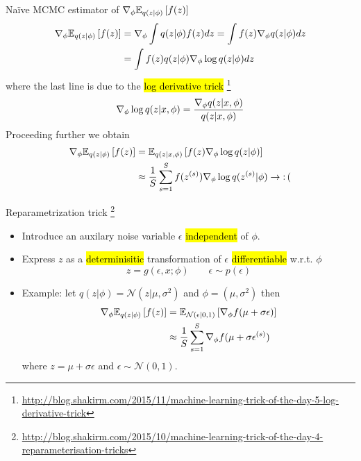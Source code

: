 \documentclass[unicode,11pt]{beamer}
\begin{document}
\begin{frame}{Na\"ive MCMC estimator of $\grad_\phi \E{q(z|\phi)}{f(z)}$}
  \begin{align*}
    \grad_\phi \E{q(z|\phi)}{f(z)}
    &= \grad_\phi \int q(z|\phi) f(z) dz
     = \int f(z) \grad_\phi q(z|\phi) dz \\
    &= \int f(z) q(z|\phi) \grad_\phi \log q(z|\phi) dz
  \end{align*}
  where the last line is due to the \hl{log derivative trick}
  \footnote{%
    \url{http://blog.shakirm.com/2015/11/machine-learning-trick-of-the-day-5-log-derivative-trick}}
  $$
  \nabla_\phi \log q(z|x, \phi) = \frac{\nabla_\phi q(z|x, \phi)}{q(z|x, \phi)}
  $$
  Proceeding further we obtain
  \begin{align*}
    \grad_\phi \E{q(z|\phi)}{f(z)}
    &= \E{q(z|x, \phi)}{f(z) \grad_\phi \log q(z|\phi)} \\
    &\approx \frac{1}{S} \sum\limits_{s = 1}^S f(z^{(s)}) \grad_\phi \log q(z^{(s)}|\phi)
    \to \op{:(}
  \end{align*}

\end{frame}


\begin{frame}{Reparametrization trick%
  \footnote{\url{http://blog.shakirm.com/2015/10/machine-learning-trick-of-the-day-4-reparameterisation-tricks}}}
  \begin{itemize}
  \item Introduce an auxilary noise variable $\epsilon$ \hl{independent} of
    $\phi$.
  \item Express $z$ as a \hl{determinisitic} transformation of $\epsilon$
    \hl{differentiable} w.r.t. $\phi$
    $$
    z = g(\epsilon, x; \phi)
    \qquad
    \epsilon \sim p(\epsilon)
    $$
  \item  Example: let $q(z|\phi) = \mathcal{N}(z|\mu, \sigma^2)$ and
    $\phi = (\mu, \sigma^2)$ then
    \begin{align*}
      \grad_\phi \E{q(z|\phi)}{f(z)}
      &= \E{\mathcal{N}(\epsilon|0, 1)}{\grad_\phi f(\mu + \sigma \epsilon)} \\
      &\approx \frac{1}{S} \sum\limits_{s = 1}^S \grad_\phi f(\mu + \sigma \epsilon^{(s)})
    \end{align*}
    where $z = \mu + \sigma\epsilon$ and $\epsilon \sim \mathcal{N}(0, 1)$.
  \end{itemize}
\end{frame}
\end{document}
